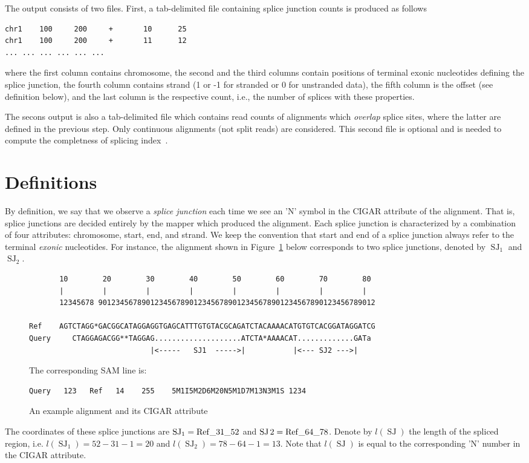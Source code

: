 \documentclass{article}
\DeclareMathOperator{\SJ}{SJ}
\begin{document}
The output consists of two files. First, a tab-delimited file containing splice junction counts is produced as follows
\begin{verbatim}
chr1    100     200     +       10      25
chr1    100     200     +       11      12
...	...	...	...	...	...
\end{verbatim}
where the first column contains chromosome, the second and the third columns contain positions of terminal exonic 
nucleotides defining the splice junction, the fourth column contains strand (1 or -1 for stranded or 0 for unstranded 
data), the fifth column is the offset (see definition below), and the last column is the respective count, i.e., the 
number of splices with these properties.

The secons output is also a tab-delimited file which contains read counts of alignments which {\em overlap} splice sites, 
where the latter are defined in the previous step. Only continuous alignments (not split reads) are considered. This second 
file is optional and is needed to compute the completness of splicing index~\cite{pmid23172860, pmid22955974}.

\section{Definitions}
By definition, we say that we observe a {\em splice junction} each time we see an 'N' symbol in the CIGAR attribute of 
the alignment. That is, splice junctions are decided entirely by the mapper which produced the alignment.
Each splice junction is characterized by a combination of four attributes: chromosome, start, end, and 
strand. We keep the convention that start and end of a splice junction always refer to the terminal {\it exonic}
nucleotides. For instance, the alignment shown in Figure~\ref{fig::01} below corresponds to two splice junctions,  
denoted by $\SJ_1$ and $\SJ_2$. 
%
\begin{figure}[h]
\footnotesize
\begin{verbatim}
       10        20        30        40        50        60        70        80
       |         |         |         |         |         |         |         |
       12345678 9012345678901234567890123456789012345678901234567890123456789012

Ref    AGTCTAGG*GACGGCATAGGAGGTGAGCATTTGTGTACGCAGATCTACAAAACATGTGTCACGGATAGGATCG
Query     CTAGGAGACGG**TAGGAG....................ATCTA*AAAACAT.............GATa
                            |<-----   SJ1  ----->|           |<--- SJ2 --->|
\end{verbatim}
The corresponding SAM line is:
\begin{verbatim}
Query   123   Ref   14    255    5M1I5M2D6M20N5M1D7M13N3M1S 1234 
\end{verbatim}
\caption{An example alignment and its CIGAR attribute\label{fig::01}}
\end{figure}
%
The coordinates of these splice junctions are $\SJ_1=\rm Ref\_31\_52$ and $\SJ2=\rm Ref\_64\_78$. Denote
by $l(\SJ)$ the length of the spliced region, i.e. $l(\SJ_1)=52-31-1=20$ and $l(\SJ_2)=78-64-1=13$. Note that
$l(\SJ)$ is equal to the corresponding 'N' number in the CIGAR attribute.
\end{document}
